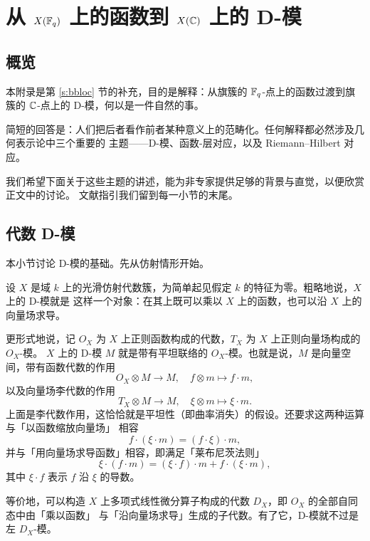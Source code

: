\zhappendix

\section{从 $X(\mathbb{F}_q)$ 上的函数到 $X(\mathbb{C})$ 上的 D-模}
\label{s:frmfun}

\subsection{概览}

\ssszh 本附录是第 \ref{s:bbloc} 节的补充，目的是解释：从旗簇的 $\mathbb{F}_q$-点上的函数过渡到旗簇的 $\mathbb{C}$-点上的
D-模，何以是一件自然的事。

简短的回答是：人们把后者看作前者某种意义上的范畴化。任何解释都必然涉及几何表示论中三个重要的
主题——D-模、函数-层对应，以及 Riemann--Hilbert 对应。

我们希望下面关于这些主题的讲述，能为非专家提供足够的背景与直觉，以便欣赏正文中的讨论。
文献指引我们留到每一小节的末尾。

\subsection{代数 D-模}

\ssszh 本小节讨论 D-模的基础。先从仿射情形开始。

设 $X$ 是域 $k$ 上的光滑仿射代数簇，为简单起见假定 $k$ 的特征为零。粗略地说，$X$ 上的 D-模就是
这样一个对象：在其上既可以乘以 $X$ 上的函数，也可以沿 $X$ 上的向量场求导。

更形式地说，记 $O_X$ 为 $X$ 上正则函数构成的代数，$T_X$ 为 $X$ 上正则向量场构成的 $O_X$-模。
$X$ 上的 D-模 $M$ 就是带有平坦联络的 $O_X$-模。也就是说，$M$ 是向量空间，带有函数代数的作用
\[
O_X\otimes M\to M,\quad f\otimes m\mapsto f\cdot m,
\]
以及向量场李代数的作用
\[
T_X\otimes M\to M,\quad \xi\otimes m\mapsto \xi\cdot m.
\]
上面是李代数作用，这恰恰就是平坦性（即曲率消失）的假设。还要求这两种运算与「以函数缩放向量场」
相容
\[
f\cdot(\xi\cdot m)=(f\cdot\xi)\cdot m,
\]
并与「用向量场求导函数」相容，即满足「莱布尼茨法则」
\[
\xi\cdot(f\cdot m)=(\xi\cdot f)\cdot m+f\cdot(\xi\cdot m),
\]
其中 $\xi\cdot f$ 表示 $f$ 沿 $\xi$ 的导数。

等价地，可以构造 $X$ 上多项式线性微分算子构成的代数 $D_X$，即 $O_X$ 的全部自同态中由「乘以函数」
与「沿向量场求导」生成的子代数。有了它，D-模就不过是左 $D_X$-模。

